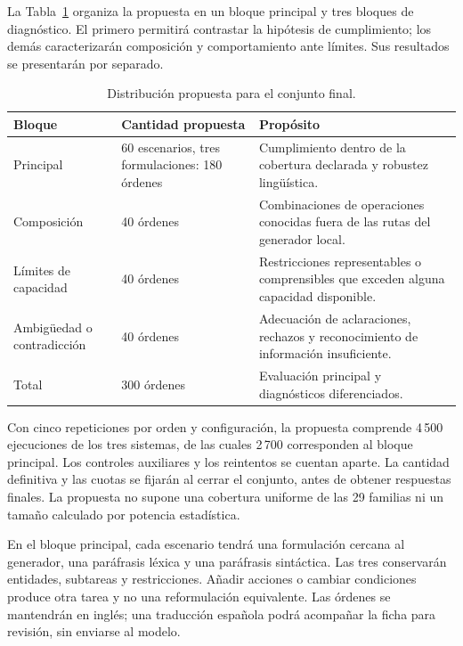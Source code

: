 La Tabla~\ref{tab:conjunto_final_cap6} organiza la propuesta en un bloque
principal y tres bloques de diagnóstico. El primero permitirá contrastar
la hipótesis de cumplimiento; los demás caracterizarán composición y
comportamiento ante límites. Sus resultados se presentarán por separado.

\begin{table}[htbp]
\centering
\small
\caption{Distribución propuesta para el conjunto final.}
\label{tab:conjunto_final_cap6}
\begin{tabularx}{\textwidth}{@{}p{}p{}X@{}}
\toprule
\textbf{Bloque} & \textbf{Cantidad propuesta} & \textbf{Propósito} \\
\midrule
Principal & 60 escenarios, tres formulaciones: 180 órdenes & Cumplimiento dentro de la cobertura declarada y robustez lingüística. \\
Composición & 40 órdenes & Combinaciones de operaciones conocidas fuera de las rutas del generador local. \\
Límites de capacidad & 40 órdenes & Restricciones representables o comprensibles que exceden alguna capacidad disponible. \\
Ambigüedad o contradicción & 40 órdenes & Adecuación de aclaraciones, rechazos y reconocimiento de información insuficiente. \\
\midrule
Total & 300 órdenes & Evaluación principal y diagnósticos diferenciados. \\
\bottomrule
\end{tabularx}
\end{table}

Con cinco repeticiones por orden y configuración, la propuesta comprende
4\,500 ejecuciones de los tres sistemas, de las cuales 2\,700 corresponden
al bloque principal. Los controles auxiliares y los reintentos se cuentan
aparte. La cantidad definitiva y las cuotas se fijarán al cerrar el conjunto,
antes de obtener respuestas finales. La propuesta no supone una cobertura
uniforme de las 29 familias ni un tamaño calculado por potencia estadística.

En el bloque principal, cada escenario tendrá una formulación cercana
al generador, una paráfrasis léxica y una paráfrasis sintáctica. Las tres
conservarán entidades, subtareas y restricciones. Añadir acciones o cambiar
condiciones produce otra tarea y no una reformulación equivalente.
Las órdenes se mantendrán en inglés; una traducción española podrá
acompañar la ficha para revisión, sin enviarse al modelo.

